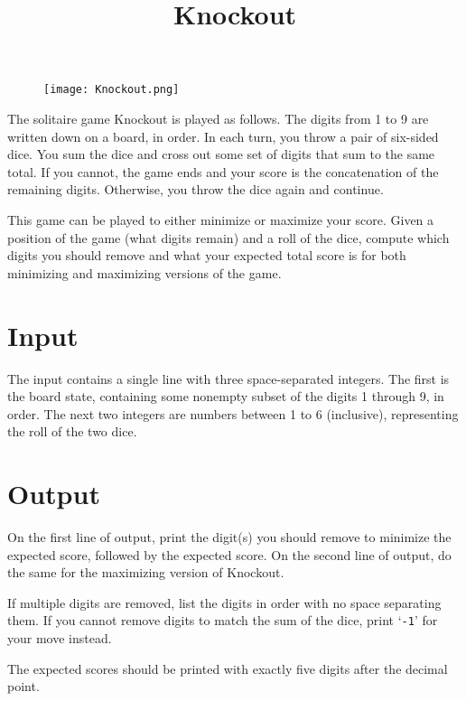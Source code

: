 \documentclass{article}
\title{Knockout}
\date{}
\begin{document}
\maketitle
\begin{figure}[h!]
\centering
\texttt{[image: Knockout.png]}
\end{figure}


The solitaire game Knockout is played as follows. The digits from
1 to 9 are written down on a board, in order.
In each turn, you throw a pair
of six-sided dice. You sum the dice and cross out some set of digits
that sum to the same total. If you cannot, the game ends and your
score is the concatenation of the remaining digits. Otherwise, you
throw the dice again and continue.

This game can be played to either minimize or maximize your score.
Given a position of the game (what digits remain) and a roll of the
dice, compute which digits you should remove and what your expected
total score is for both minimizing and maximizing versions of the game.

\section{Input}

The input contains a single line with three space-separated integers.
The first is the board state, containing some nonempty subset of the
digits 1 through 9, in order. The next two integers are numbers
between 1 to 6 (inclusive), representing the roll of the two dice.

\section{Output}

On the first line of output, print the digit(s) you should remove
to minimize the expected score, followed by the expected score.
On the second line of output, do the same for the maximizing version
of Knockout.

If multiple digits are removed, list the digits in order with
no space separating them. If you cannot remove digits to match the
sum of the dice, print `{\tt -1}' for your move instead.

The expected scores should be printed with exactly five digits
after the decimal point.


\end{document}
